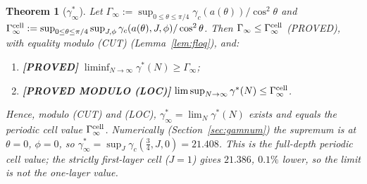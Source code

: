 \documentclass[11pt]{article}
\newtheorem{theorem}{Theorem}[section]
\theoremstyle{definition}
\theoremstyle{remark}
\newcommand{\lab}[1]{\textbf{[#1]}}
\begin{document}
\begin{theorem}[$\gamma^\ast_\infty$]\label{thm:gam}
Let $\Gamma_\infty:=\sup_{0\le\theta\le\pi/4}\gamma_c(a(\theta))/\cos^2\theta$ and $\Gamma^{\rm cell}_\infty:=\sup_{0\le\theta\le\pi/4}\sup_{J,\phi}\gamma_c(a(\theta),J,\phi)/\cos^2\theta$. Then $\Gamma_\infty\le\Gamma^{\rm cell}_\infty$ (PROVED), with equality modulo (CUT) (Lemma~\ref{lem:floq}), and:
\begin{enumerate}[label=(\alph*)]
\item \lab{PROVED} $\liminf_{N\to\infty}\gamma^\ast(N)\ge\Gamma_\infty$;
\item \lab{PROVED MODULO (LOC)} $\limsup_{N\to\infty}\gamma^\ast(N)\le\Gamma^{\rm cell}_\infty$.
\end{enumerate}
Hence, modulo (CUT) and (LOC), $\gamma^\ast_\infty=\lim_N\gamma^\ast(N)$ exists and equals the periodic cell value $\Gamma^{\rm cell}_\infty$. Numerically (Section~\ref{sec:gamnum}) the supremum is at $\theta=0$, $\phi=0$, so $\gamma^\ast_\infty=\sup_J\gamma_c(\frac34,J,0)=21.408$. This is the \emph{full-depth} periodic cell value; the strictly first-layer cell ($J=1$) gives $21.386$, $0.1\%$ lower, so the limit is not the one-layer value.
\end{theorem}
\end{document}
